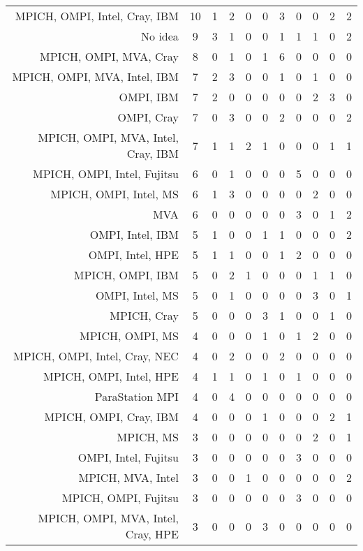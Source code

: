 {\begin{landscape}
\begin{longtable}[htb]{r|c|c|c|c|c|c|c|c|c|c}
{MPICH, OMPI, Intel, Cray, IBM} & 10 & 1 & 2 & 0 & 0 & 3 & 0 & 0 & 2 & 2 \\%
{No idea} & 9 & 3 & 1 & 0 & 0 & 1 & 1 & 1 & 0 & 2 \\%
{MPICH, OMPI, MVA, Cray} & 8 & 0 & 1 & 0 & 1 & 6 & 0 & 0 & 0 & 0 \\%
{MPICH, OMPI, MVA, Intel, IBM} & 7 & 2 & 3 & 0 & 0 & 1 & 0 & 1 & 0 & 0 \\%
{OMPI, IBM} & 7 & 2 & 0 & 0 & 0 & 0 & 0 & 2 & 3 & 0 \\%
{OMPI, Cray} & 7 & 0 & 3 & 0 & 0 & 2 & 0 & 0 & 0 & 2 \\%
{MPICH, OMPI, MVA, Intel, Cray, IBM} & 7 & 1 & 1 & 2 & 1 & 0 & 0 & 0 & 1 & 1 \\%
{MPICH, OMPI, Intel, Fujitsu} & 6 & 0 & 1 & 0 & 0 & 0 & 5 & 0 & 0 & 0 \\%
{MPICH, OMPI, Intel, MS} & 6 & 1 & 3 & 0 & 0 & 0 & 0 & 2 & 0 & 0 \\%
{MVA} & 6 & 0 & 0 & 0 & 0 & 0 & 3 & 0 & 1 & 2 \\%
{OMPI, Intel, IBM} & 5 & 1 & 0 & 0 & 1 & 1 & 0 & 0 & 0 & 2 \\%
{OMPI, Intel, HPE} & 5 & 1 & 1 & 0 & 0 & 1 & 2 & 0 & 0 & 0 \\%
{MPICH, OMPI, IBM} & 5 & 0 & 2 & 1 & 0 & 0 & 0 & 1 & 1 & 0 \\%
{OMPI, Intel, MS} & 5 & 0 & 1 & 0 & 0 & 0 & 0 & 3 & 0 & 1 \\%
{MPICH, Cray} & 5 & 0 & 0 & 0 & 3 & 1 & 0 & 0 & 1 & 0 \\%
{MPICH, OMPI, MS} & 4 & 0 & 0 & 0 & 1 & 0 & 1 & 2 & 0 & 0 \\%
{MPICH, OMPI, Intel, Cray, NEC} & 4 & 0 & 2 & 0 & 0 & 2 & 0 & 0 & 0 & 0 \\%
{MPICH, OMPI, Intel, HPE} & 4 & 1 & 1 & 0 & 1 & 0 & 1 & 0 & 0 & 0 \\%
{ParaStation MPI} & 4 & 0 & 4 & 0 & 0 & 0 & 0 & 0 & 0 & 0 \\%
{MPICH, OMPI, Cray, IBM} & 4 & 0 & 0 & 0 & 1 & 0 & 0 & 0 & 2 & 1 \\%
{MPICH, MS} & 3 & 0 & 0 & 0 & 0 & 0 & 0 & 2 & 0 & 1 \\%
{OMPI, Intel, Fujitsu} & 3 & 0 & 0 & 0 & 0 & 0 & 3 & 0 & 0 & 0 \\%
{MPICH, MVA, Intel} & 3 & 0 & 0 & 1 & 0 & 0 & 0 & 0 & 0 & 2 \\%
{MPICH, OMPI, Fujitsu} & 3 & 0 & 0 & 0 & 0 & 0 & 3 & 0 & 0 & 0 \\%
{MPICH, OMPI, MVA, Intel, Cray, HPE} & 3 & 0 & 0 & 0 & 3 & 0 & 0 & 0 & 0 & 0 \\%

\end{longtable}
\end{landscape}}
